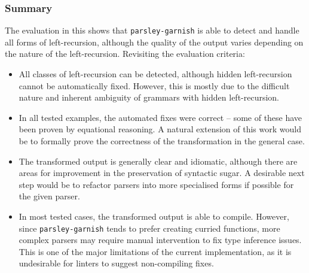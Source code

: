 \documentclass[../../main.tex]{subfiles}
\begin{document}
\subsubsection*{Summary}
The evaluation in this  shows that \texttt{parsley-garnish} is able to detect and handle all forms of left-recursion, although the quality of the output varies depending on the nature of the left-recursion.
Revisiting the evaluation criteria:
\begin{itemize}
  \item All classes of left-recursion can be detected, although hidden left-recursion cannot be automatically fixed. However, this is mostly due to the difficult nature and inherent ambiguity of grammars with hidden left-recursion.
  \item In all tested examples, the automated fixes were correct -- some of these have been proven by equational reasoning. A natural extension of this work would be to formally prove the correctness of the transformation in the general case.
  \item The transformed output is generally clear and idiomatic, although there are areas for improvement in the preservation of syntactic sugar. A desirable next step would be to refactor  parsers into more specialised forms if possible for the given parser.
  \item In most tested cases, the transformed output is able to compile. However, since \texttt{parsley-garnish} tends to prefer creating curried functions, more complex parsers may require manual intervention to fix type inference issues. This is one of the major limitations of the current implementation, as it is undesirable for linters to suggest non-compiling fixes.
\end{itemize}




\end{document}
